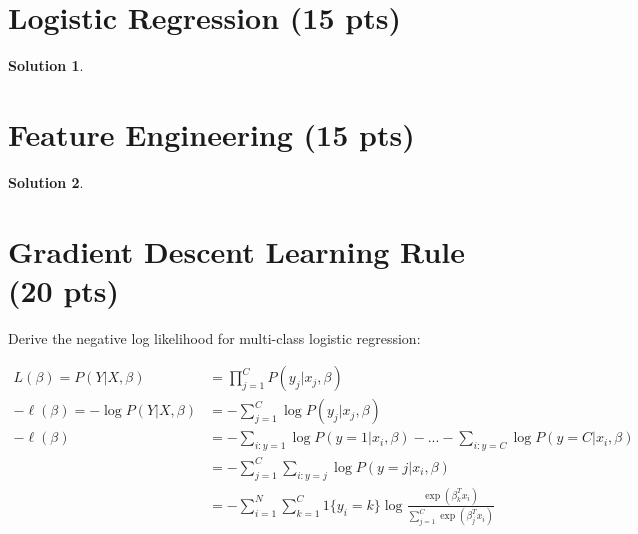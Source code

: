 \documentclass[11pt]{article}
\newtheorem*{solution*}{Solution}
\begin{document}
\thispagestyle{empty}

\newlength{\boxlength}\setlength{\boxlength}{\textwidth}
\addtolength{\boxlength}{-4mm}

\begin{center}
\end{center}




\section{Logistic Regression (15 pts)}

\begin{solution*}
\end{solution*}


\section{Feature Engineering (15 pts)}

\begin{solution*}
\end{solution*}

\section{Gradient Descent Learning Rule (20 pts)}

Derive the negative log likelihood for multi-class logistic regression:

\begin{align*}
	L (\beta) = P(Y \vert X, \beta) &= \prod_{j = 1}^{C} P(y_{j} \vert x_{j}, \beta)\\
	-\ell(\beta) = -\log P(Y \vert X, \beta) &= -\sum_{j = 1}^{C} \log P(y_{j} \vert x_{j}, \beta)\\
	-\ell(\beta) &= -\sum_{i:y=1}\log P(y = 1 \vert x_{i}, \beta) - ... - \sum_{i:y=C}\log P(y = C \vert x_{i}, \beta)\\
	&= -\sum_{j = 1}^{C} \sum_{i:y=j} \log P(y = j \vert x_{i}, \beta)\\
	&= -\sum_{i = 1}^{N} \sum_{k=1}^{C} 1\{y_{i} = k\} \log \frac{\exp(\beta_{k}^{T}x_{i})}{\sum_{j=1}^{C}\exp(\beta_{j}^{T}x_{i})}
\end{align*}
\end{document}
